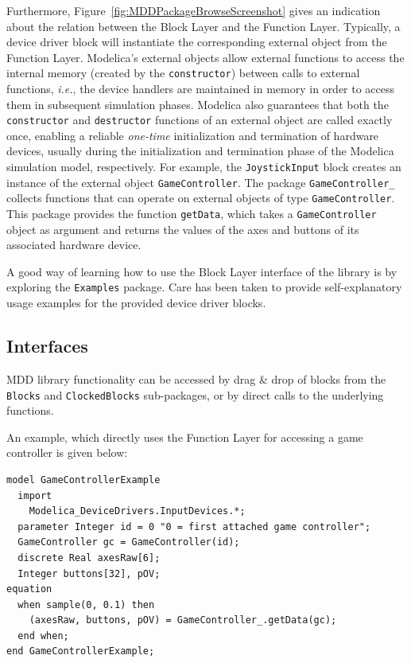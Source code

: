\documentclass{resources/modelica}
\newcommand{\modelica}[1]{\lstinline[language=modelica]|#1|}
\begin{document}
\noindent
Furthermore, Figure~\ref{fig:MDDPackageBrowseScreenshot} gives an indication
about the relation between the \textsf{Block Layer} and the \textsf{Function Layer}. Typically, a
device driver block will instantiate the corresponding external object from the
\textsf{Function Layer}. Modelica's external objects allow external functions to access the internal memory (created by the \modelica{constructor}) between calls to external functions, \textit{i.e.}, the
device handlers are maintained in memory in order to access them in subsequent simulation phases.
Modelica also guarantees that both the \modelica{constructor} and \modelica{destructor} functions of
an external object are called exactly once, enabling a reliable \emph{one-time} initialization and termination of hard\-ware devices, usually during the initialization and termination phase of the Modelica simulation model, respectively.
For example, the \modelica{JoystickInput} block creates an instance of the
external object \mbox{\modelica{GameController}.} The package
\modelica{GameController_} collects functions that can operate on external
objects of type \mbox{\modelica{GameController}.} This package provides the function
\modelica{getData}, which takes a \modelica{GameController} object as
argument and returns the values of the axes and buttons of its associated
hardware device.

A good way of learning how to use the \textsf{Block Layer} interface of the library is by
exploring the \modelica{Examples} package. Care has been taken to provide
self-explanatory usage examples for the provided device driver blocks.

\subsection{Interfaces}

MDD library functionality can be accessed by drag \& drop of blocks
from the \modelica{Blocks} and \modelica{ClockedBlocks} sub-packages, or by
direct calls to the underlying functions.

An example, which directly uses the \textsf{Function Layer} for accessing a
game controller is given below:
\begin{lstlisting}[language=modelica]
model GameControllerExample
  import
    Modelica_DeviceDrivers.InputDevices.*;
  parameter Integer id = 0 "0 = first attached game controller";
  GameController gc = GameController(id);
  discrete Real axesRaw[6];
  Integer buttons[32], pOV;
equation
  when sample(0, 0.1) then
    (axesRaw, buttons, pOV) = GameController_.getData(gc);
  end when;
end GameControllerExample;
\end{lstlisting}
\end{document}
